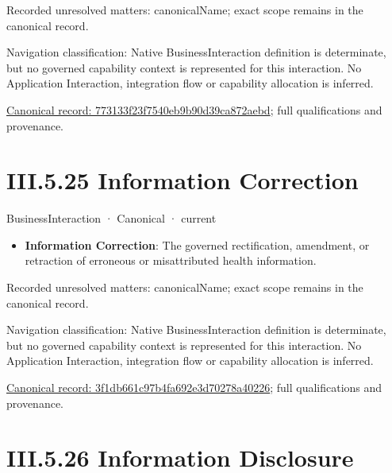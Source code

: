 {\small Recorded unresolved matters: canonicalName; exact scope remains in the canonical record.}\par
{\small Navigation classification: Native BusinessInteraction definition is determinate, but no governed capability context is represented for this interaction. No Application Interaction, integration flow or capability allocation is inferred.}\par
{\footnotesize \href{../../../../continuum/business/business-interaction/773133f23f7540eb9b90d39ca872aebd.md}{Canonical record: 773133f23f7540eb9b90d39ca872aebd}; full qualifications and provenance.}\par
\section*{III.5.25 Information Correction}
\label{navigation:III.5.25}

\label{element:3f1db661c97b4fa692e3d70278a40226}
{\small BusinessInteraction · Canonical · current}\par

\begin{itemize}


\item \textbf{Information Correction}: The governed rectification, amendment, or retraction of erroneous or misattributed health information.

\end{itemize}

{\small Recorded unresolved matters: canonicalName; exact scope remains in the canonical record.}\par
{\small Navigation classification: Native BusinessInteraction definition is determinate, but no governed capability context is represented for this interaction. No Application Interaction, integration flow or capability allocation is inferred.}\par
{\footnotesize \href{../../../../continuum/business/business-interaction/3f1db661c97b4fa692e3d70278a40226.md}{Canonical record: 3f1db661c97b4fa692e3d70278a40226}; full qualifications and provenance.}\par
\section*{III.5.26 Information Disclosure}
\label{navigation:III.5.26}

